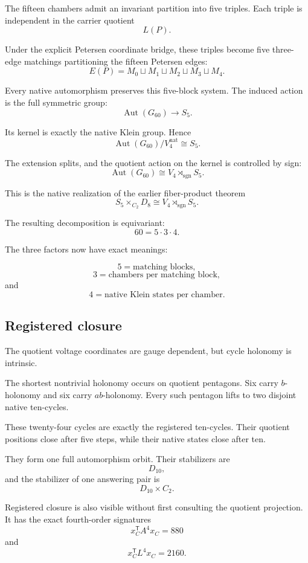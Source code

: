 The fifteen chambers admit an invariant partition into five triples.
Each triple is independent in the carrier quotient
\[
L(P).
\]

Under the explicit Petersen coordinate bridge, these triples become
five three-edge matchings partitioning the fifteen Petersen edges:
\[
E(P)
=
M_0\sqcup M_1\sqcup M_2\sqcup M_3\sqcup M_4.
\]

Every native automorphism preserves this five-block system. The
induced action is the full symmetric group:
\[
\operatorname{Aut}(G_{60})
\longrightarrow
S_5.
\]

Its kernel is exactly the native Klein group. Hence
\[
\operatorname{Aut}(G_{60})/V_4^{\mathrm{nat}}
\cong
S_5.
\]

The extension splits, and the quotient action on the kernel is
controlled by sign:
\[
\operatorname{Aut}(G_{60})
\cong
V_4\rtimes_{\operatorname{sgn}}S_5.
\]

This is the native realization of the earlier fiber-product theorem
\[
S_5\times_{C_2}D_8
\cong
V_4\rtimes_{\operatorname{sgn}}S_5.
\]

The resulting decomposition is equivariant:
\[
60
=
5
\cdot
3
\cdot
4.
\]

The three factors now have exact meanings:

\[
5
=
\text{matching blocks},
\]
\[
3
=
\text{chambers per matching block},
\]
and
\[
4
=
\text{native Klein states per chamber}.
\]

\subsection{Registered closure}

The quotient voltage coordinates are gauge dependent, but cycle
holonomy is intrinsic.

The shortest nontrivial holonomy occurs on quotient pentagons. Six
carry \(b\)-holonomy and six carry \(ab\)-holonomy. Every such
pentagon lifts to two disjoint native ten-cycles.

These twenty-four cycles are exactly the registered ten-cycles. Their
quotient positions close after five steps, while their native states
close after ten.

They form one full automorphism orbit. Their stabilizers are
\[
D_{10},
\]
and the stabilizer of one answering pair is
\[
D_{10}\times C_2.
\]

Registered closure is also visible without first consulting the
quotient projection. It has the exact fourth-order signatures
\[
x_C^{\mathsf T}A^4x_C=880
\]
and
\[
x_C^{\mathsf T}L^4x_C=2160.
\]

